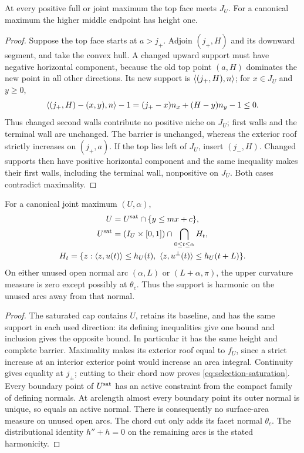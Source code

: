 \begin{lemma}\label{lem:selection-top}
At every positive full or joint maximum the top face meets $J_U$.
For a canonical maximum the higher middle endpoint has height one.
\end{lemma}

\begin{proof}
Suppose the top face starts at $a>j_+$. Adjoin $(j_+,H)$ and its
downward segment, and take the convex hull. A changed upward support
must have negative horizontal component, because the old top point
$(a,H)$ dominates the new point in all other directions. Its new
support is $\langle (j_+,H),n\rangle$; for $x\in J_U$ and $y\ge0$,
\[
 \langle (j_+,H)-(x,y),n\rangle-1
 =(j_+-x)n_x+(H-y)n_y-1\le0.
\]
Thus changed second walls contribute no positive niche on $J_U$;
first walls and the terminal wall are unchanged. The barrier is
unchanged, whereas the exterior roof strictly increases on
$(j_+,a)$. If the top lies left of $J_U$, insert $(j_-,H)$.
Changed supports then have positive horizontal component and the
same inequality makes their first walls, including the terminal
wall, nonpositive on $J_U$. Both cases contradict maximality.
\end{proof}

\begin{lemma}[Saturation]\label{lem:selection-saturation}
For a canonical joint maximum $(U,\alpha)$,
\begin{equation}\label{eq:selection-saturation}
 \begin{gathered}
 U=U^{\rm sat}\cap\{y\le mx+c\},\\
 U^{\rm sat}=(I_U\times[0,1])\cap
 \bigcap_{0\le t\le\alpha} H_t,\\
 H_t=\{z:\langle z,u(t)\rangle\le h_U(t),\
             \langle z,u^\perp(t)\rangle\le h_U(t+L)\}.
 \end{gathered}
\end{equation}
On either unused open normal arc $(\alpha,L)$ or $(L+\alpha,\pi)$,
the upper curvature measure is zero except possibly at $\theta_c$.
Thus the support is harmonic on the unused arcs away from that normal.
\end{lemma}

\begin{proof}
The saturated cap contains $U$, retains its baseline, and has the
same support in each used direction: its defining inequalities give
one bound and inclusion gives the opposite bound. In particular it
has the same height and complete barrier. Maximality makes its
exterior roof equal to $f_U$, since a strict increase at an interior
exterior point would increase an area integral. Continuity gives
equality at $j_\pm$; cutting to their chord now proves
\eqref{eq:selection-saturation}.
Every boundary point of $U^{\rm sat}$ has an active constraint from
the compact family of defining normals. At arclength almost every
boundary point its outer normal is unique, so equals an active
normal. There is consequently no surface-area measure on unused
open arcs. The chord cut only adds its facet normal $\theta_c$.
The distributional identity $h''+h=0$ on the remaining arcs is the
stated harmonicity.
\end{proof}

